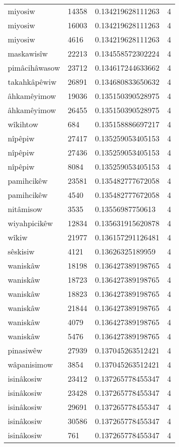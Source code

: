 \begin{longtable}{llll}
miyosiw & 14358 & 0.134219628111263 & 4 \\
miyosiw & 16003 & 0.134219628111263 & 4 \\
miyosiw & 4616 & 0.134219628111263 & 4 \\
maskawisîw & 22213 & 0.134558572302224 & 4 \\
pimâcihâwasow & 23712 & 0.134617244633662 & 4 \\
takahkâpêwiw & 26891 & 0.134680833650632 & 4 \\
âhkamêyimow & 19036 & 0.135150390528975 & 4 \\
âhkamêyimow & 26455 & 0.135150390528975 & 4 \\
wîkihtow & 684 & 0.135158886697217 & 4 \\
nîpêpiw & 27417 & 0.135259053405153 & 4 \\
nîpêpiw & 27436 & 0.135259053405153 & 4 \\
nîpêpiw & 8084 & 0.135259053405153 & 4 \\
pamihcikêw & 23581 & 0.135482777672058 & 4 \\
pamihcikêw & 4540 & 0.135482777672058 & 4 \\
nitâmisow & 3535 & 0.13556987750613 & 4 \\
wiyahpicikêw & 12834 & 0.135631915620878 & 4 \\
wîkiw & 21977 & 0.136157291126481 & 4 \\
sêskisiw & 4121 & 0.13626325189959 & 4 \\
waniskâw & 18198 & 0.136427389198765 & 4 \\
waniskâw & 18723 & 0.136427389198765 & 4 \\
waniskâw & 18823 & 0.136427389198765 & 4 \\
waniskâw & 21844 & 0.136427389198765 & 4 \\
waniskâw & 4079 & 0.136427389198765 & 4 \\
waniskâw & 5476 & 0.136427389198765 & 4 \\
pinasiwêw & 27939 & 0.137045263512421 & 4 \\
wâpanisimow & 3854 & 0.137045263512421 & 4 \\
isinâkosiw & 23412 & 0.137265778455347 & 4 \\
isinâkosiw & 23428 & 0.137265778455347 & 4 \\
isinâkosiw & 29691 & 0.137265778455347 & 4 \\
isinâkosiw & 30586 & 0.137265778455347 & 4 \\
isinâkosiw & 761 & 0.137265778455347 & 4 \\

\end{longtable}
